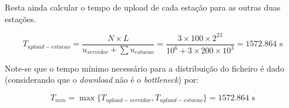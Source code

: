\begin{enumerate}[leftmargin=\labelsep]
        Resta ainda calcular o tempo de upload de cada estação para as outras duas estações.

        $$
          T_{upload-estacao} = \frac{N \times L}{u_{servidor} + \sum{u_{estacao}}} = \frac {3 \times 100 \times 2^{23}}{10^6 + 3 \times 200 \times 10^3} = 1572.864 \text{ s}
        $$

        Note-se que o tempo mínimo necessário para a distribuição do ficheiro é dado
        (considerando que o \textit{download} não é o \textit{bottleneck}) por:

        $$
          T_{min} = \max\{T_{upload-servidor}, T_{upload-estacao}\} = 1572.864 \text{ s}
        $$
\end{enumerate}